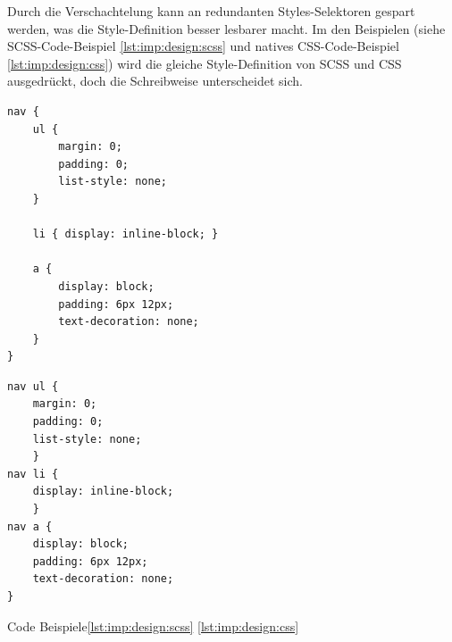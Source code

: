 Durch die Verschachtelung kann an redundanten Styles-Selektoren gespart werden, was die Style-Definition besser lesbarer macht. Im den Beispielen (siehe SCSS-Code-Beispiel \ref{lst:imp:design:scss} und natives CSS-Code-Beispiel \ref{lst:imp:design:css}) wird die gleiche Style-Definition von SCSS und CSS ausgedrückt, doch die Schreibweise unterscheidet sich.

\cite[Sass Guide]{SassGuide}

\begin{lstlisting}[caption=SCSS - Code Beispiel,label=lst:imp:design:scss]
nav {
    ul {
        margin: 0;
        padding: 0;
        list-style: none;
    }
    
    li { display: inline-block; }
    
    a {
        display: block;
        padding: 6px 12px;
        text-decoration: none;
    }
}
\end{lstlisting}

\begin{lstlisting}[caption=CSS - Code Beispiel,label=lst:imp:design:css]
nav ul {
    margin: 0;
    padding: 0;
    list-style: none;
    }
nav li {
    display: inline-block;
    }
nav a {
    display: block;
    padding: 6px 12px;
    text-decoration: none;
}
\end{lstlisting}

Code Beispiele\ref{lst:imp:design:scss} \ref{lst:imp:design:css} \cite[Sass Guide]{SassGuide}




